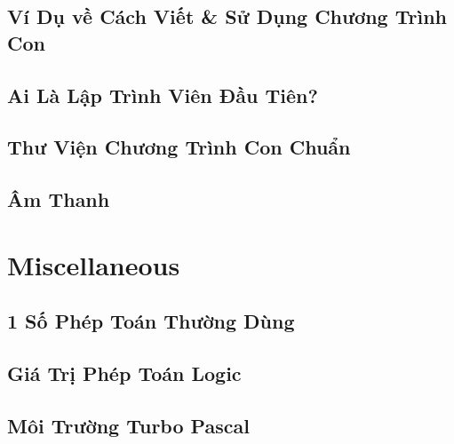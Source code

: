 \documentclass[oneside]{book}
\numberwithin{equation}{section}
\begin{document}

\section{Ví Dụ về Cách Viết \& Sử Dụng Chương Trình Con}


\section{Ai Là Lập Trình Viên Đầu Tiên?}


\section{Thư Viện Chương Trình Con Chuẩn}


\section{Âm Thanh}


\appendix

\chapter{Miscellaneous}

\section{1 Số Phép Toán Thường Dùng}


\section{Giá Trị Phép Toán Logic}


\section{Môi Trường Turbo Pascal}
\end{document}
